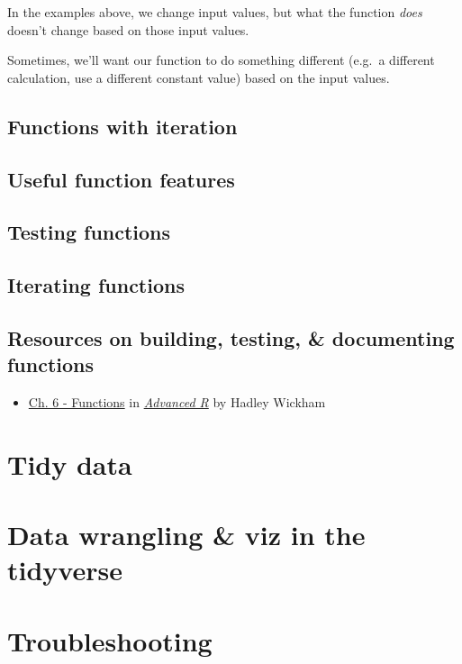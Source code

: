 \documentclass[
]{book}
\providecommand{\tightlist}{%
  \setlength{\itemsep}{0pt}\setlength{\parskip}{0pt}}
\begin{document}
In the examples above, we change input values, but what the function \emph{does} doesn't change based on those input values.

Sometimes, we'll want our function to do something different (e.g.~a different calculation, use a different constant value) based on the input values.

\hypertarget{functions-with-iteration}{%
\section{Functions with iteration}\label{functions-with-iteration}}

\hypertarget{useful-function-features}{%
\section{Useful function features}\label{useful-function-features}}

\hypertarget{testing-functions}{%
\section{Testing functions}\label{testing-functions}}

\hypertarget{iterating-functions}{%
\section{Iterating functions}\label{iterating-functions}}

\hypertarget{resources-on-building-testing-documenting-functions}{%
\section{Resources on building, testing, \& documenting functions}\label{resources-on-building-testing-documenting-functions}}

\begin{itemize}
\tightlist
\item
  \href{https://adv-r.hadley.nz/functions.html}{Ch. 6 - Functions} in \href{https://adv-r.hadley.nz/}{\emph{Advanced R}} by Hadley Wickham
\end{itemize}

\hypertarget{tidydata}{%
\chapter{Tidy data}\label{tidydata}}

\hypertarget{tidyverse}{%
\chapter{Data wrangling \& viz in the tidyverse}\label{tidyverse}}

\hypertarget{troubleshooting}{%
\chapter{Troubleshooting}\label{troubleshooting}}

  
\end{document}
